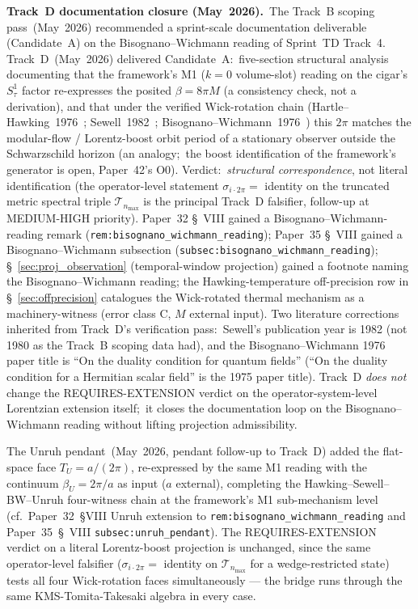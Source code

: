 \documentclass[11pt]{article}
\begin{document}
\begin{enumerate}
\textbf{Track~D documentation closure (May~2026).}\ The Track~B
scoping pass~(May~2026) recommended a sprint-scale documentation deliverable
(Candidate~A) on the Bisognano--Wichmann reading of Sprint~TD
Track~4.  Track~D~(May~2026) delivered Candidate~A:\ five-section structural analysis
documenting that the framework's M1 ($k = 0$ volume-slot) reading on
the cigar's $S^1_\tau$ factor re-expresses the posited $\beta = 8\pi M$
(a consistency check, not a derivation), and that under the
verified Wick-rotation chain
(Hartle--Hawking~1976~\cite{hartle_hawking1976};
 Sewell~1982~\cite{sewell1982};
 Bisognano--Wichmann~1976~\cite{bisognano_wichmann1976}) this $2\pi$
matches the modular-flow / Lorentz-boost orbit period of a stationary
observer outside the Schwarzschild horizon (an analogy;\ the boost
identification of the framework's generator is open, Paper~42's O0).  Verdict:\ \emph{structural
correspondence}, not literal identification (the operator-level
statement $\sigma_{i\cdot 2\pi} = $ identity on the truncated metric
spectral triple $\mathcal{T}_{n_{\max}}$ is the principal Track~D
falsifier, follow-up at MEDIUM-HIGH priority).  Paper~32
\S~VIII gained a Bisognano--Wichmann-reading remark
(\texttt{rem:bisognano\_wichmann\_reading}); Paper~35 \S~VIII gained
a Bisognano--Wichmann subsection
(\texttt{subsec:bisognano\_wichmann\_reading});
\S~\ref{sec:proj_observation} (temporal-window projection) gained a
footnote naming the Bisognano--Wichmann reading; the
Hawking-temperature off-precision row in
\S~\ref{sec:offprecision} catalogues the Wick-rotated thermal
mechanism as a machinery-witness (error class C, $M$ external
input).  Two literature corrections inherited from Track~D's
verification pass:\ Sewell's publication year is 1982 (not 1980
as the Track~B scoping data had), and the Bisognano--Wichmann 1976
paper title is ``On the duality condition for quantum fields''
(``On the duality condition for a Hermitian scalar field'' is the
1975 paper title).  Track~D \emph{does not} change the
REQUIRES-EXTENSION verdict on the operator-system-level Lorentzian
extension itself;\ it closes the documentation loop on the
Bisognano--Wichmann reading without lifting projection
admissibility.

The Unruh pendant~(May~2026,
pendant follow-up to Track~D) added the flat-space face
$T_U = a/(2\pi)$, re-expressed by the same M1 reading with the
continuum $\beta_U = 2\pi/a$ as input ($a$ external), completing the Hawking--Sewell--BW--Unruh four-witness chain at the
framework's M1 sub-mechanism level (cf.~Paper~32~§VIII Unruh
extension to \texttt{rem:bisognano\_wichmann\_reading} and
Paper~35~\S~VIII \texttt{subsec:unruh\_pendant}).  The
REQUIRES-EXTENSION verdict on a literal Lorentz-boost projection is
unchanged, since the same operator-level falsifier
($\sigma_{i\cdot 2\pi} = $ identity on $\mathcal{T}_{n_{\max}}$ for
a wedge-restricted state) tests all four Wick-rotation faces
simultaneously --- the bridge runs through the same
KMS-Tomita-Takesaki algebra in every case.


\end{enumerate}
\end{document}
